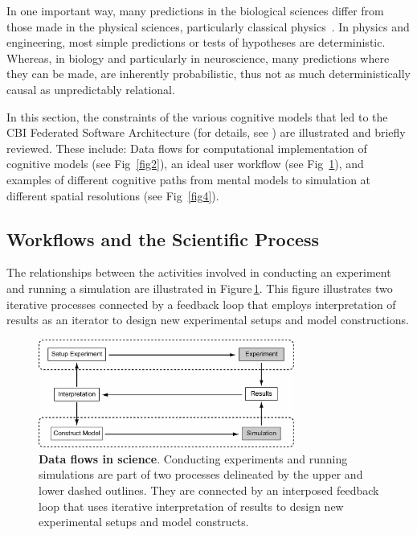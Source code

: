 \documentclass[10pt,letterpaper]{article}
\begin{document}
In one important way, many predictions in the biological sciences differ from those made in the physical sciences, particularly classical physics~\cite{darwin71}. In physics and engineering, most simple predictions or tests of hypotheses are deterministic. Whereas, in biology and particularly in neuroscience, many predictions where they can be made, are inherently probabilistic, thus not as much deterministically causal as unpredictably relational.

In this section, the constraints of the various cognitive models that led to the CBI Federated Software Architecture (for details, see \cite{cornelis12,cornelis08:_cbi_archit_comput_simul_realis}) are illustrated and briefly reviewed. These include: Data flows for computational implementation of cognitive models (see Fig~\ref{fig2}), an ideal user workflow (see Fig~\ref{fig3}), and examples of different cognitive paths from mental models to simulation at different spatial resolutions (see Fig~\ref{fig4}).

\subsection*{Workflows and the Scientific Process}

The relationships between the activities involved in conducting an experiment and running a simulation are illustrated in Figure\,\ref{fig3}.  This figure illustrates two iterative processes connected by a feedback loop that employs interpretation of results as an iterator to design new experimental setups and model constructions.

\begin{figure}[h!t]
  \begin{center}
    \includegraphics[width=0.75\textwidth]{figures/exp-sim.pdf}
  \end{center}
  \caption{ \small{\textbf{Data flows in science}. Conducting experiments and running simulations are part of two processes delineated by the upper and lower dashed outlines. They are connected by an interposed feedback loop that uses iterative interpretation of results to design new experimental setups and model constructs.}}
    \label{fig3}
\end{figure}
\end{document}
